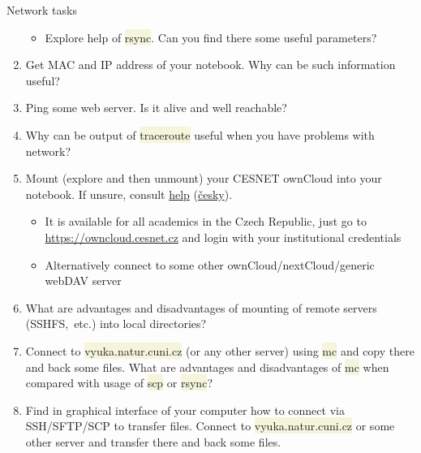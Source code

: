\documentclass[compress, ucs, xelatex, 11pt, xcolor=svgnames, aspectratio=169,
	hyperref={
		bookmarks=true,
		unicode=true,
		colorlinks=true,
		pdftitle={Linux, command line and MetaCentrum},
		plainpages=false,
		pdfauthor={Vojtech Zeisek},
		pdfsubject={Course about use of Linux command line, writing shell scripts and using MetaCentrum of CESNET},
		pdfcreator={XeLaTeX},
		pdfkeywords={Linux, GNU, BASH, shell, command line, MetaCentrum},
		linkcolor=DarkRed, %
		anchorcolor=DarkBlue, %
		citecolor=Indigo, %
		filecolor=NavyBlue, %
		menucolor=DarkMagenta, %
		urlcolor=DarkBlue, %
		pdftex},
	url={hyphens, lowtilde} %
	]{beamer}
\renewcommand{\texttt}[1]{\colorbox{Beige}{{\ttfamily #1}}}
\begin{document}
\begin{frame}[allowframebreaks]{Network tasks}
\begin{enumerate}
\begin{itemize}
			\item Explore help of \texttt{rsync}. Can you find there some useful parameters?
		\end{itemize}
		\item Get MAC and IP address of your notebook. Why can be such information useful?
		\item Ping some web server. Is it alive and well reachable?
		\item Why can be output of \texttt{traceroute} useful when you have problems with network?
		\item Mount (explore and then unmount) your CESNET ownCloud into your notebook. If unsure, consult \href{https://du.cesnet.cz/en/navody/owncloud/start}{help} (\href{https://du.cesnet.cz/cs/navody/owncloud/start}{česky}).
		\begin{itemize}
			\item It is available for all academics in the Czech Republic, just go to \url{https://owncloud.cesnet.cz} and login with your institutional credentials
			\item Alternatively connect to some other ownCloud/nextCloud/generic webDAV server
		\end{itemize}
		\item What are advantages and disadvantages of mounting of remote servers (SSHFS,~etc.) into local directories?
		\item Connect to \texttt{vyuka.natur.cuni.cz} (or any other server) using \texttt{mc} and copy there and back some files. What are advantages and disadvantages of \texttt{mc} when compared with usage of \texttt{scp} or \texttt{rsync}?
		\item Find in graphical interface of your computer how to connect via SSH/SFTP/SCP to transfer files. Connect to \texttt{vyuka.natur.cuni.cz} or some other server and transfer there and back some files.
	\end{enumerate}
\end{frame}
\end{document}
